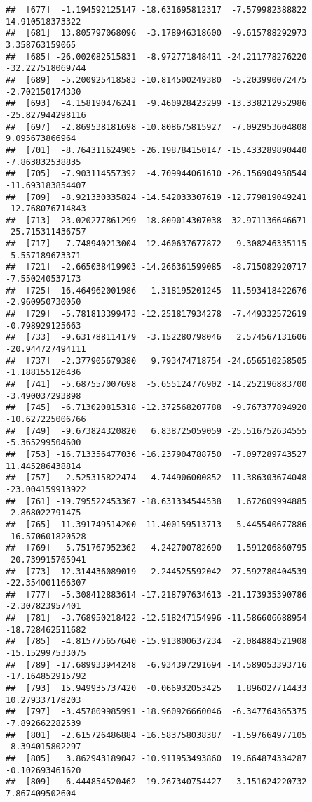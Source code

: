 \documentclass[
]{article}
\begin{document}
\begin{verbatim}
##  [677]  -1.194592125147 -18.631695812317  -7.579982388822  14.910518373322
##  [681]  13.805797068096  -3.178946318600  -9.615788292973   3.358763159065
##  [685] -26.002082515831  -8.972771848411 -24.211778276220 -32.227518069744
##  [689]  -5.200925418583 -10.814500249380  -5.203990072475  -2.702150174330
##  [693]  -4.158190476241  -9.460928423299 -13.338212952986 -25.827944298116
##  [697]  -2.869538181698 -10.808675815927  -7.092953604808   9.095673866964
##  [701]  -8.764311624905 -26.198784150147 -15.433289890440  -7.863832538835
##  [705]  -7.903114557392  -4.709944061610 -26.156904958544 -11.693183854407
##  [709]  -8.921330335824 -14.542033307619 -12.779819049241 -12.768076714843
##  [713] -23.020277861299 -18.809014307038 -32.971136646671 -25.715311436757
##  [717]  -7.748940213004 -12.460637677872  -9.308246335115  -5.557189673371
##  [721]  -2.665038419903 -14.266361599085  -8.715082920717  -7.550240537173
##  [725] -16.464962001986  -1.318195201245 -11.593418422676  -2.960950730050
##  [729]  -5.781813399473 -12.251817934278  -7.449332572619  -0.798929125663
##  [733]  -9.631788114179  -3.152280798046   2.574567131606 -20.944727494111
##  [737]  -2.377905679380   9.793474718754 -24.656510258505  -1.188155126436
##  [741]  -5.687557007698  -5.655124776902 -14.252196883700  -3.490037293898
##  [745]  -6.713020815318 -12.372568207788  -9.767377894920 -10.627225006766
##  [749]  -9.673824320820   6.838725059059 -25.516752634555  -5.365299504600
##  [753] -16.713356477036 -16.237904788750  -7.097289743527  11.445286438814
##  [757]   2.525315822474   4.744906000852  11.386303674048 -23.004159913922
##  [761] -19.795522453367 -18.631334544538   1.672609994885  -2.868022791475
##  [765] -11.391749514200 -11.400159513713   5.445540677886 -16.570601820528
##  [769]   5.751767952362  -4.242700782690  -1.591206860795 -20.739915705941
##  [773] -12.314436089019  -2.244525592042 -27.592780404539 -22.354001166307
##  [777]  -5.308412883614 -17.218797634613 -21.173935390786  -2.307823957401
##  [781]  -3.768950218422 -12.518247154996 -11.586606688954 -18.728462511682
##  [785]  -4.815775657640 -15.913800637234  -2.084884521908 -15.152997533075
##  [789] -17.689933944248  -6.934397291694 -14.589053393716 -17.164852915792
##  [793]  15.949935737420  -0.066932053425   1.896027714433  10.279337178203
##  [797]  -3.457809985991 -18.960926660046  -6.347764365375  -7.892662282539
##  [801]  -2.615726486884 -16.583758038387  -1.597664977105  -8.394015802297
##  [805]   3.862943189042 -10.911953493860  19.664874334287  -0.102693461620
##  [809]  -6.444854520462 -19.267340754427  -3.151624220732   7.867409502604

\end{verbatim}
\end{document}
